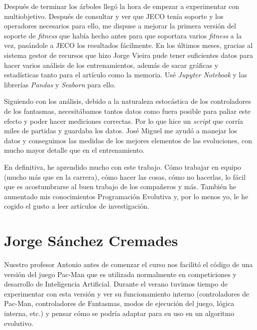 Después de terminar los árboles llegó la hora de empezar a experimentar con multiobjetivo. Después de consultar y ver que JECO tenía soporte y los operadores necesarios para ello, me dispuse a mejorar la primera versión del soporte de \textit{fitness} que había hecho antes para que soportara varios \textit{fitness} a la vez, pasándole a JECO los resultados fácilmente.
En los últimos meses, gracias al sistema gestor de recursos que hizo Jorge Vieira pude tener suficientes datos para hacer varios análisis de los entrenamientos, además de sacar gráficas y estadísticas tanto para el artículo como la memoria. Usé \textit{Jupyter Notebook} y las librerías \textit{Pandas} y \textit{Seaborn} para ello.

Siguiendo con los análisis, debido a la naturaleza estocástica de los controladores de los fantasmas, necesitábamos tantos datos como fuera posible para paliar este efecto y poder hacer mediciones correctas. Por lo que hice un \textit{script} que corría miles de partidas y guardaba los datos. José Miguel me ayudó a manejar los datos y conseguimos las medidas de los mejores elementos de las evoluciones, con mucho mayor detalle que en el entrenamiento.

En definitiva, he aprendido mucho con este trabajo. Cómo trabajar en equipo (mucho más que en la carrera), cómo hacer las cosas, cómo no hacerlas, lo fácil que es acostumbrarse al buen trabajo de los compañeros y más. También he aumentado mis conocimientos Programación Evolutiva y, por lo menos yo, le he cogido el gusto a leer artículos de investigación.

\section{Jorge Sánchez Cremades}
Nuestro profesor Antonio antes de comenzar el curso nos facilitó el código de una versión del juego Pac-Man que es utilizada normalmente en competiciones y desarrollo de Inteligencia Artificial. Durante el verano tuvimos tiempo de experimentar con esta versión y ver su funcionamiento interno (controladores de Pac-Man, controladores de Fantasmas, modos de ejecución del juego, lógica interna, etc.) y pensar cómo se podría adaptar para su uso en un algoritmo evolutivo.

